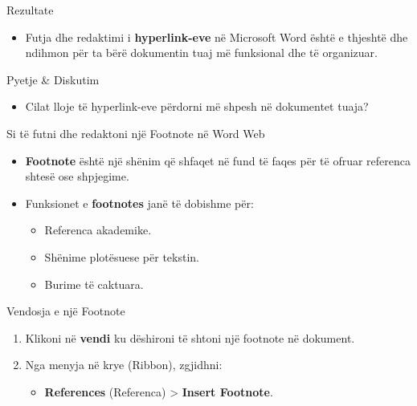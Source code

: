 \documentclass[
  ignorenonframetext,
]{beamer}
\providecommand{\tightlist}{%
  \setlength{\itemsep}{0pt}\setlength{\parskip}{0pt}}
\begin{document}
\begin{frame}{Rezultate}
\label{rezultate-1}
\begin{itemize}
\tightlist
\item
  Futja dhe redaktimi i \textbf{hyperlink-eve} në Microsoft Word është e
  thjeshtë dhe ndihmon për ta bërë dokumentin tuaj më funksional dhe të
  organizuar.
\end{itemize}
\end{frame}

\begin{frame}{Pyetje \& Diskutim}
\label{pyetje-diskutim-1}
\begin{itemize}
\tightlist
\item
  Cilat lloje të hyperlink-eve përdorni më shpesh në dokumentet tuaja?
\end{itemize}
\end{frame}

\begin{frame}{Si të futni dhe redaktoni një Footnote në Word Web}
\label{si-tuxeb-futni-dhe-redaktoni-njuxeb-footnote-nuxeb-word-web}
\begin{itemize}
\item
  \textbf{Footnote} është një shënim që shfaqet në fund të faqes për të
  ofruar referenca shtesë ose shpjegime.
\item
  Funksionet e \textbf{footnotes} janë të dobishme për:

  \begin{itemize}
  \item
    Referenca akademike.
  \item
    Shënime plotësuese për tekstin.
  \item
    Burime të caktuara.
  \end{itemize}
\end{itemize}
\end{frame}

\begin{frame}{Vendosja e një Footnote}
\label{vendosja-e-njuxeb-footnote}
\begin{enumerate}
\item
  Klikoni në \textbf{vendi} ku dëshironi të shtoni një footnote në
  dokument.
\item
  Nga menyja në krye (Ribbon), zgjidhni:

  \begin{itemize}
  \tightlist
  \item
    \textbf{References} (Referenca) \textgreater{} \textbf{Insert
    Footnote}.
  \end{itemize}
\end{enumerate}
\end{frame}
\end{document}
